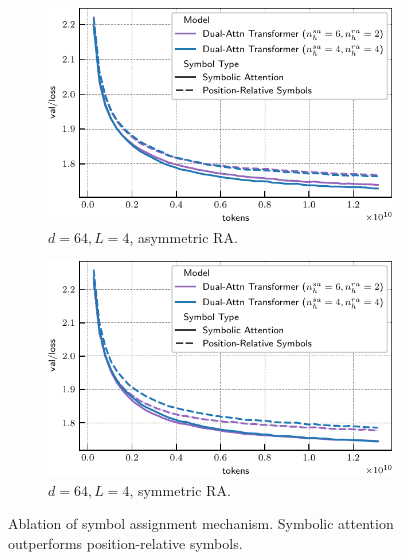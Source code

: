 \begin{figure}
    \centering
    \begin{subfigure}[t]{0.45\textwidth}
        \centering
        \includegraphics[width=\textwidth]{figs/experiments/tiny_stories/d64L4_ablation_symboltype_asymra.pdf}
        \caption{$d=64, L=4$, asymmetric RA.}
    \end{subfigure}
    \hfill
    \begin{subfigure}[t]{0.45\textwidth}
        \centering
        \includegraphics[width=\textwidth]{figs/experiments/tiny_stories/d64L4_ablation_symboltype_symra.pdf}
        \caption{$d=64, L=4$, symmetric RA.}
    \end{subfigure}
    \caption{Ablation of symbol assignment mechanism. Symbolic attention outperforms position-relative symbols.}\label{fig:ablation_symbol_type}
\end{figure}

